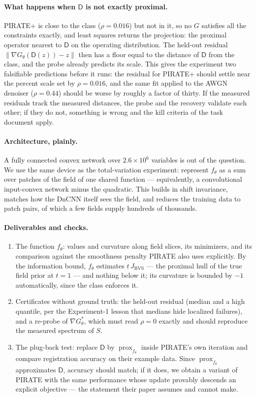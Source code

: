 \documentclass[11pt]{article}
\newcommand{\D}{\mathsf{D}}
\newcommand{\prox}{\operatorname{prox}}
\newcommand{\Jbvs}{J_{\mathrm{BVS}}}
\begin{document}
\paragraph{What happens when $\D$ is not exactly proximal.} PIRATE+ is close to the class ($\rho = 0.016$) but not in it, so no $G$ satisfies all the constraints exactly, and least squares returns the projection: the proximal operator nearest to $\D$ on the operating distribution. The held-out residual $\|\nabla G_\theta(\D(z)) - z\|$ then has a floor equal to the distance of $\D$ from the class, and the probe already predicts its scale. This gives the experiment two falsifiable predictions before it runs: the residual for PIRATE+ should settle near the percent scale set by $\rho = 0.016$, and the same fit applied to the AWGN denoiser ($\rho = 0.44$) should be worse by roughly a factor of thirty. If the measured residuals track the measured distances, the probe and the recovery validate each other; if they do not, something is wrong and the kill criteria of the task document apply.

\paragraph{Architecture, plainly.} A fully connected convex network over $2.6 \times 10^6$ variables is out of the question. We use the same device as the total-variation experiment: represent $f_\theta$ as a sum over patches of the field of one shared function --- equivalently, a convolutional input-convex network minus the quadratic. This builds in shift invariance, matches how the DnCNN itself sees the field, and reduces the training data to patch pairs, of which a few fields supply hundreds of thousands.

\paragraph{Deliverables and checks.}
\begin{enumerate}
\item The function $f_\theta$: values and curvature along field slices, its minimizers, and its comparison against the smoothness penalty PIRATE also uses explicitly. By the information bound, $f_\theta$ estimates $t\,\Jbvs$ --- the proximal hull of the true field prior at $t = 1$ --- and nothing below it; its curvature is bounded by $-1$ automatically, since the class enforces it.
\item Certificates without ground truth: the held-out residual (median and a high quantile, per the Experiment-1 lesson that medians hide localized failures), and a re-probe of $\nabla G_\theta^*$, which must read $\rho = 0$ exactly and should reproduce the measured spectrum of $S$.
\item The plug-back test: replace $\D$ by $\prox_{f_\theta}$ inside PIRATE's own iteration and compare registration accuracy on their example data. Since $\prox_{f_\theta}$ approximates $\D$, accuracy should match; if it does, we obtain a variant of PIRATE with the same performance whose update provably descends an explicit objective --- the statement their paper assumes and cannot make.
\end{enumerate}
\end{document}
